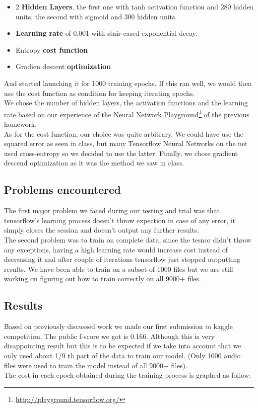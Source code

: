 \documentclass{article} %
\begin{document}
\begin{enumerate}
					\begin{itemize}
						\item 2 \textbf{Hidden Layers}, the first one with tanh activation function and 280 hidden units, the second with sigmoid and 300 hidden units.
						\item \textbf{Learning rate} of 0.001 with stair-cased exponential decay.
						\item Entropy \textbf{cost function}
						\item Gradien descent \textbf{optimization}
					\end{itemize}
					And started launching it for 1000 training epochs. If this ran well, we would then use the cost function as condition for keeping iterating epochs.\\
					\newline
					We chose the number of hidden layers, the activation functions and the learning rate based on our experience of the Neural Network Playground\footnote{\url{http://playground.tensorflow.org/}} of the previous homework.\\
					\newline
					As for the cost function, our choice was quite arbitrary. We could have use the squared error as seen in class, but many Tensorflow Neural Networks on the net used cross-entropy so we decided to use the latter. Finally, we chose gradient descend optimization as it was the method we saw in class.
			\end{enumerate}


        \subsection{Problems encountered}
        The first major problem we faced during our testing and trial was that tensorflow's learning process doesn't throw expection in case of any error, it simply closes the session and doesn't output any further results.\\
        \newline
        The second problem was to train on complete data, since the tesnor didn't throw any exceptions, having a high learning rate would increase cost instead of decreasing it and after couple of iterations tensorflow just stopped outputting results. We have been able to train on a subset of 1000 files but we are still working on figuring out how to train correctly on all 9000+ files.
        
        \subsection{Results}
        Based on previously discussed work we made our first submission to kaggle competition. The public f-score we got is 0.166. Although this is very disappointing result but this is to be expected if we take into account that we only used about 1/9 th part of the data to train our model. (Only 1000 audio files were used to train the model instead of all 9000+ files).\\
        \newline
        The cost in each epoch obtained during the training process is graphed as follow:\\
\end{document}
